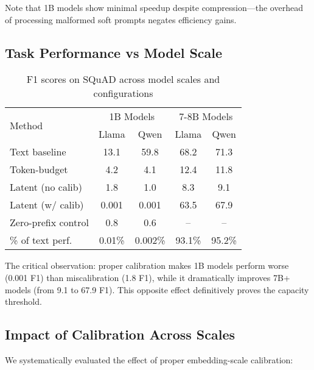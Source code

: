 \documentclass{article}
\begin{document}
Note that 1B models show minimal speedup despite compression—the overhead of processing malformed soft prompts negates efficiency gains.

\subsection{Task Performance vs Model Scale}

\begin{table}[h]
\caption{F1 scores on SQuAD across model scales and configurations}
\label{tab:f1_scale_extended}
\vskip 0.15in
\begin{center}
\begin{small}
\begin{tabular}{lcccc}
\toprule
\multirow{2}{*}{Method} & \multicolumn{2}{c}{1B Models} & \multicolumn{2}{c}{7-8B Models} \\
& Llama & Qwen & Llama & Qwen \\
\midrule
Text baseline & 13.1 & 59.8 & 68.2 & 71.3 \\
Token-budget & 4.2 & 4.1 & 12.4 & 11.8 \\
Latent (no calib) & 1.8 & 1.0 & 8.3 & 9.1 \\
Latent (w/ calib) & 0.001 & 0.001 & 63.5 & 67.9 \\
Zero-prefix control & 0.8 & 0.6 & -- & -- \\
\midrule
\% of text perf. & 0.01\% & 0.002\% & 93.1\% & 95.2\% \\
\bottomrule
\end{tabular}
\end{small}
\end{center}
\vskip -0.1in
\end{table}

The critical observation: proper calibration makes 1B models perform worse (0.001 F1) than miscalibration (1.8 F1), while it dramatically improves 7B+ models (from 9.1 to 67.9 F1). This opposite effect definitively proves the capacity threshold.

\subsection{Impact of Calibration Across Scales}

We systematically evaluated the effect of proper embedding-scale calibration:
\end{document}
